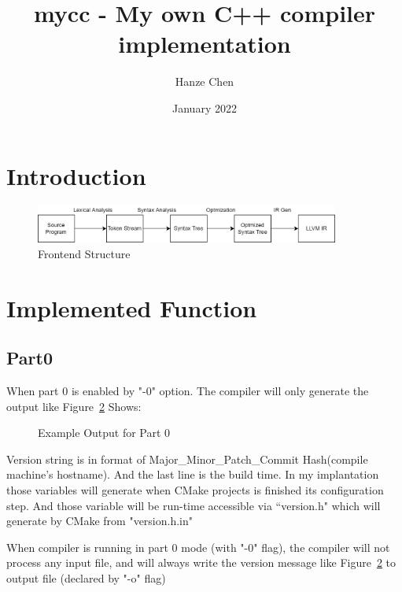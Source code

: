 \documentclass{article}
\title{mycc - My own C++ compiler implementation}
\author{Hanze Chen}
\date{January 2022}
\begin{document}
	\maketitle
	\section{Introduction}\label{sec:introduction}
	\begin{figure}[hb!]
		\centering
		\includegraphics[width=10cm]{figure/frontend_structure}
		\caption{Frontend Structure}
		\label{fig:frontend_structure}
	\end{figure}
	\section{Implemented Function}\label{sec:implemented-function}
	\subsection{Part0}\label{subsec:part0}
	When part 0 is enabled by "-0" option.
	The compiler will only generate the output like Figure~\ref{fig:example_part0_output} Shows: \par
	\begin{figure}[hb!]
		\centering
		\caption{Example Output for Part 0}
		\label{fig:example_part0_output}
	\end{figure}

	Version string is in format of Major\_Minor\_Patch\_Commit Hash(compile machine's hostname). And the last line is
	the build time. In my implantation those variables will generate when CMake projects is finished its configuration
	step. And those variable will be run-time accessible via “version.h" which will generate by CMake from "version.h.in" \par

	When compiler is running in part 0 mode (with "-0" flag), the compiler will not process any input file, and will
	always write the version message like Figure~\ref{fig:example_part0_output} to output file (declared by "-o" flag)
\end{document}

